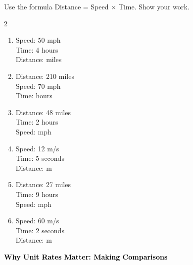 \documentclass[12pt, letterpaper, fleqn]{article}
\newcommand{\blank}{\underline{\hspace{2.2cm}}}
\begin{document}
\noindent
Use the formula Distance = Speed $\times$ Time. Show your work.

\vspace{3mm}

\begin{multicols}{2}
\begin{enumerate}[itemsep=4cm, leftmargin=0.6cm]

\item Speed: 50 mph\\
\vspace{1cm}
Time: 4 hours\\
Distance: \blank \; miles

\item Distance: 210 miles\\
\vspace{1cm}
Speed: 70 mph\\
Time: \blank \; hours

\item Distance: 48 miles\\
\vspace{1cm}
Time: 2 hours\\
Speed: \blank \; mph

\item Speed: 12 m/s\\
\vspace{1cm}
Time: 5 seconds\\
Distance: \blank \; m

\item Distance: 27 miles\\
\vspace{1cm}
Time: 9 hours\\
Speed: \blank \; mph

\item Speed: 60 m/s\\
\vspace{1cm}
Time: 2 seconds\\
Distance: \blank \; m

\end{enumerate}
\end{multicols}

\newpage


\begin{tcolorbox}[colback=customteal!20]
\large\textcolor{black}{\textbf{Why Unit Rates Matter: Making Comparisons}}
\end{tcolorbox}
\end{document}
